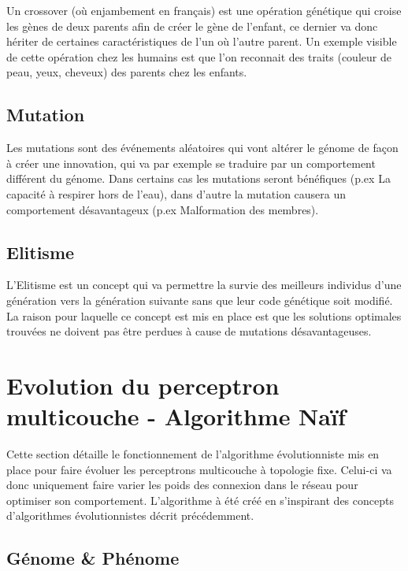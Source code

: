 \documentclass{article}
\begin{document}
Un crossover (où enjambement en français) est une opération génétique qui croise les gènes de deux parents afin de créer le gène de l'enfant, ce dernier va donc hériter de certaines caractéristiques de l'un où l'autre parent. Un exemple visible de cette opération chez les humains est que l'on reconnait des traits (couleur de peau, yeux, cheveux) des parents chez les enfants.\cite{wikicrossover}\\

\subsection{Mutation}

Les mutations sont des événements aléatoires qui vont altérer le génome de façon à créer une innovation, qui va par exemple se traduire par un comportement différent du génome. Dans certains cas les mutations seront bénéfiques (p.ex La capacité à respirer hors de l'eau), dans d'autre la mutation causera un comportement désavantageux (p.ex Malformation des membres).\cite{wikimutation}\\

\subsection{Elitisme}

L'Elitisme est un concept qui va permettre la survie des meilleurs individus d'une génération vers la génération suivante sans que leur code génétique soit modifié.\cite{elitism}\\
La raison pour laquelle ce concept est mis en place est que les solutions optimales trouvées ne doivent pas être perdues à cause de mutations désavantageuses.


\newpage
\section{Evolution du perceptron multicouche - Algorithme Naïf}

Cette section détaille le fonctionnement de l'algorithme évolutionniste mis en place pour faire évoluer les perceptrons multicouche à topologie fixe. Celui-ci va donc uniquement faire varier les poids des connexion dans le réseau pour optimiser son comportement. L'algorithme à été créé en s'inspirant des concepts d'algorithmes évolutionnistes décrit précédemment.

\subsection{Génome \& Phénome}
\end{document}
